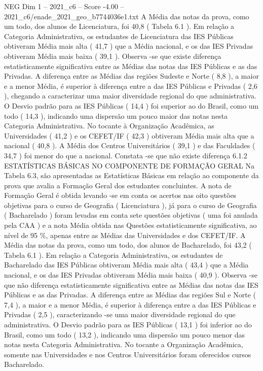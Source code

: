 \begin{textsample}{NEG Dim 1 – 2021\_c6 – Score -4.00 – 2021\_c6/enade\_2021\_geo\_b7744036e1.txt}
A Média das notas da prova, como um todo, dos alunos de Licenciatura, foi 40,8 ( Tabela 6.1 ).
Em relação a Categoria Administrativa, os estudantes de Licenciatura das IES Públicas obtiveram Média mais alta ( 41,7 ) que a Média nacional, e os das IES Privadas obtiveram Média mais baixa ( 39,1 ).
Observa -se que existe diferença estatisticamente significativa entre as Médias das notas das IES Públicas e as das Privadas.
A diferença entre as Médias das regiões Sudeste e Norte ( 8,8 ), a maior e a menor Média, é superior à diferença entre a das IES Públicas e Privadas ( 2,6 ), chegando a caracterizar uma maior diversidade regional do que administrativa.
O Desvio padrão para as IES Públicas ( 14,4 ) foi superior ao do Brasil, como um todo ( 14,3 ), indicando uma dispersão um pouco maior das notas nesta Categoria Administrativa.
No tocante à Organização Acadêmica, as Universidades ( 41,2 ) e os CEFET/IF ( 42,3 ) obtiveram Média mais alta que a nacional ( 40,8 ).
A Média dos Centros Universitários ( 39,1 ) e das Faculdades ( 34,7 ) foi menor do que a nacional.
Constata -se que não existe diferença 6.1.2 ESTATÍSTICAS BÁSICAS NO COMPONENTE DE FORMAÇÃO GERAL Na Tabela 6.3, são apresentadas as Estatísticas Básicas em relação ao componente da prova que avalia a Formação Geral dos estudantes concluintes.
A nota de Formação Geral é obtida levando -se em conta os acertos nas oito questões objetivas para o curso de Geografia ( Licenciatura ), já para o curso de Geografia ( Bacharelado ) foram levadas em conta sete questões objetivas ( uma foi anulada pela CAA ) e a nota Média obtida nas Questões estatisticamente significativa, ao nível de 95 \%, apenas entre as Médias das Universidades e dos CEFET/IF.
A Média das notas da prova, como um todo, dos alunos de Bacharelado, foi 43,2 ( Tabela 6.1 ).
Em relação a Categoria Administrativa, os estudantes de Bacharelado das IES Públicas obtiveram Média mais alta ( 43,4 ) que a Média nacional, e os das IES Privadas obtiveram Média mais baixa ( 40,9 ).
Observa -se que não diferença estatisticamente significativa entre as Médias das notas das IES Públicas e as das Privadas.
A diferença entre as Médias das regiões Sul e Norte ( 7,4 ), a maior e a menor Média, é superior à diferença entre a das IES Públicas e Privadas ( 2,5 ), caracterizando -se uma maior diversidade regional do que administrativa.
O Desvio padrão para as IES Públicas ( 13,1 ) foi inferior ao do Brasil, como um todo ( 13,2 ), indicando uma dispersão um pouco menor das notas nesta Categoria Administrativa.
No tocante a Organização Acadêmica, somente nas Universidades e nos Centros Universitários foram oferecidos cursos Bacharelado.

\end{textsample}
